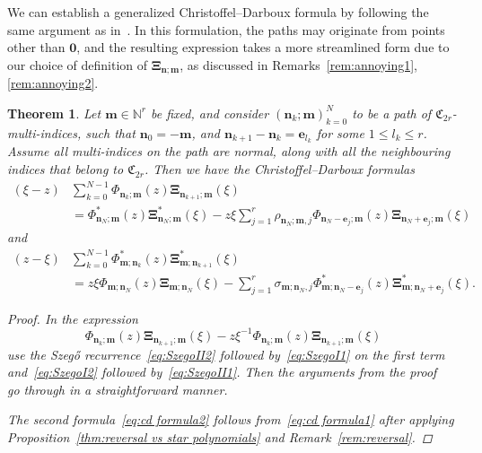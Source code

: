 \documentclass[reqno,centertags,11pt,draft]{amsart}
\newtheorem{thm}{Theorem}[section]
\newcommand{\N}{\mathbb{N}}
\begin{document}
We can establish a generalized Christoffel--Darboux formula by following the same argument as in~\cite[Thm 6.1]{KVMOPUC}. In this formulation, the paths may originate from points other than $\bm{0}$, and the resulting expression takes a more streamlined form due to our choice of definition of $\bm\Xi_{\bm{n};\bm{m}}$, as discussed in Remarks~\ref{rem:annoying1}, \ref{rem:annoying2}.
\begin{thm} 
    Let $\bm{m}\in\N^r$ be fixed, and consider $(\bm{n}_k;\bm{m})_{k = 0}^{N}$ to be a path of $\mathfrak{C}_{2r}$-multi-indices, %
    such that $\bm{n}_0 = \bm{-\bm{m}}$, 
    and $\bm{n}_{k+1}-\bm{n}_k = \bm{e}_{l_k}$ for some $1\le l_k\le r$. %
    Assume all multi-indices on the path are normal, along with all the neighbouring indices that belong to $\mathfrak{C}_{2r}$. Then we have the Christoffel--Darboux formulas
    \begin{equation}\label{eq:cd formula1}
        \begin{aligned}
    (\xi - z)& \sum_{k = 0}^{N-1} \Phi_{\bm{n}_k;\bm{m}}(z)  \bm\Xi_{\bm{n}_{k+1};\bm{m}}(\xi)
    \\
    &= \Phi^*_{\bm{n}_N;\bm{m}}(z) \bm\Xi^*_{\bm{n}_N;\bm{m}}(\xi) - z\xi \sum_{j = 1}^{r}\rho_{\bm{n}_N;\bm{m},j}\Phi_{\bm{n}_N-\bm{e}_j;\bm{m}}(z) \bm\Xi_{\bm{n}_N+\bm{e}_j;\bm{m}}(\xi)
    \end{aligned}
    \end{equation}
    and
    \begin{equation}\label{eq:cd formula2}
    \begin{aligned}
    (z-\xi)& \sum_{k = 0}^{N-1} \Phi^*_{\bm{m};\bm{n}_k}(z)  \bm\Xi^*_{\bm{m};\bm{n}_{k+1}}(\xi) 
    \\
    &= z\xi \Phi_{\bm{m};\bm{n}_N}(z)\bm\Xi_{\bm{m};\bm{n}_N}(\xi) -  \sum_{j = 1}^{r}\sigma_{\bm{m};\bm{n}_N,j}\Phi^*_{\bm{m};\bm{n}_N-\bm{e}_j}(z) \bm\Xi^*_{\bm{m};\bm{n}_N+\bm{e}_j}(\xi).
    \end{aligned}
    \end{equation}
    \begin{proof}
        In the expression
        $$
         \Phi_{\bm{n}_k;\bm{m}}(z)  \bm\Xi_{\bm{n}_{k+1};\bm{m}}(\xi) - z\xi^{-1} \Phi_{\bm{n}_k;\bm{m}}(z)  \bm\Xi_{\bm{n}_{k+1};\bm{m}}(\xi)
        $$
        use the Szeg\H{o} recurrence~\eqref{eq:SzegoII2} followed by~\eqref{eq:SzegoI1} on the first term and~\eqref{eq:SzegoI2} followed by~\eqref{eq:SzegoII1}. Then the arguments from the proof ~\cite[Thm 6.1]{KVMOPUC} go through in a straightforward manner.
        
        The second formula~\eqref{eq:cd formula2} follows from~\eqref{eq:cd formula1} after applying Proposition~\ref{thm:reversal vs star polynomials} and Remark~\ref{rem:reversal}.
    \end{proof}
\end{thm}
\end{document}
